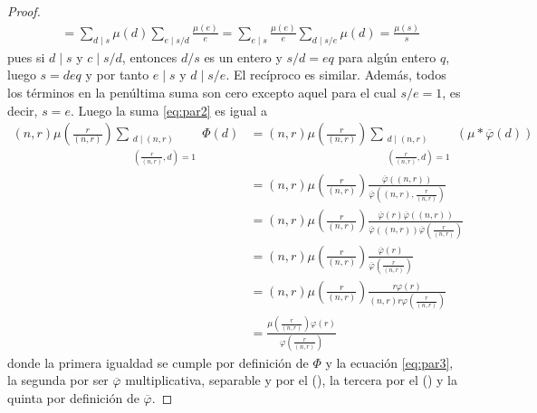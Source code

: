 \begin{proof}
\begin{equation}
\begin{split}
            & = \sum_{d \mid s} \mu(d) \sum_{e \mid s/d} \frac{\mu(e)}{e}  = \sum_{e \mid s} \frac{\mu(e)}{e} \sum_{d \mid s/e} \mu(d) = \frac{\mu(s)}{s}
\end{split}
\end{equation}
pues si $d \mid s$ y $c \mid s/d$, entonces $d/s$ es un entero y $s/d=e q$ para algún entero $q$, luego $s= d e q$ y por tanto $e \mid s$ y $d \mid s/e$. El recíproco es similar. Además, todos los términos en la penúltima suma son cero excepto aquel para el cual $s/e = 1$, es decir, $s=e$. Luego la suma \eqref{eq:par2} es igual a
\begin{align*}
    (n,r) \mu \left( \frac{r}{(n,r)} \right) \sum_{\substack{d \mid (n,r) \\ \left( \frac{r}{(n,r)},d \right)=1}} \Phi(d) & = (n,r) \mu \left( \frac{r}{(n,r)} \right) \sum_{\substack{d \mid (n,r) \\ \left( \frac{r}{(n,r)},d \right)=1}} (\mu * \overline{\varphi}(d)) \\
    & = (n,r) \mu \left( \frac{r}{(n,r)} \right) \frac{\overline{\varphi}((n,r))}{\overline{\varphi} \left( (n,r), \frac{r}{(n,r)} \right)} \\
    & = (n,r) \mu \left( \frac{r}{(n,r)} \right) \frac{\overline{\varphi}(r)\overline{\varphi}((n,r))}{\overline{\varphi}((n,r))\overline{\varphi} \left( \frac{r}{(n,r)} \right)} \\
    & = (n,r) \mu \left( \frac{r}{(n,r)} \right) \frac{\overline{\varphi}(r)}{\overline{\varphi}\left( \frac{r}{(n,r)} \right)} \\
    & = (n,r)\mu \left( \frac{r}{(n,r)} \right) \frac{r \varphi(r)}{(n,r) r \varphi \left( \frac{r}{(n,r)} \right)} \\
    & = \frac{\mu \left( \frac{r}{(n,r)} \right) \varphi(r)}{\varphi \left( \frac{r}{(n,r)} \right)}
\end{align*}
donde la primera igualdad se cumple por definición de $\Phi$ y la ecuación \eqref{eq:par3}, la segunda por ser $\overline{\varphi}$ multiplicativa, separable y por el  (\textsc{}), la tercera por el  (\textsc{}) y la quinta por definición de $\overline{\varphi}$.
\end{proof}

